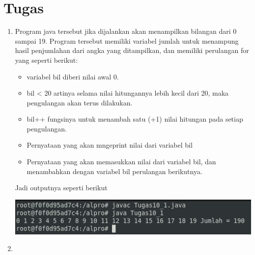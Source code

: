 \documentclass[a4paper,12pt]{article}
\begin{document}
\section{Tugas}
\begin{enumerate}
	\item 
	\begin{minipage}[t]{\linewidth}
		\raggedright
	\end{minipage}
	Program java tersebut jika dijalankan akan menampilkan bilangan dari 0 sampai 19. Program tersebut memiliki variabel jumlah untuk menampung hasil penjumlahan dari angka yang ditampilkan, dan memiliki perulangan for yang seperti berikut:
	\begin{itemize}
		\item variabel bil diberi nilai awal 0.
		\item bil < 20 artinya selama nilai hitungannya lebih kecil dari 20, maka pengulangan akan terus dilakukan. 
		\item bil++ fungsinya untuk menambah satu (+1) nilai hitungan pada setiap pengulangan.
		\item Pernyataan yang akan mngeprint nilai dari variabel bil 
		\item Pernyataan yang akan memasukkan nilai dari variabel bil, dan menambahkan dengan variabel bil perulangan berikutnya.
	\end{itemize}
	Jadi outputnya seperti berikut
	\begin{center}
		\includegraphics[scale=.7]{tugas1_2}
	\end{center}
	\item 
	\begin{minipage}[t]{\linewidth}

\end{minipage}
\end{enumerate}
\end{document}
